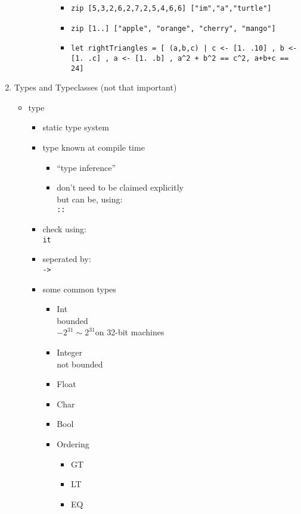 \documentclass[a4paper,10pt]{article}
\begin{document}
\begin{enumerate}
\begin{enumerate}
\begin{itemize}
\begin{itemize}
\begin{itemize}
    \item \texttt{zip [5,3,2,6,2,7,2,5,4,6,6] ["im","a","turtle"]}
    \item \texttt{zip [1..] ["apple", "orange", "cherry", "mango"]}
    \item \texttt{let rightTriangles\textquotesingle \  = [ (a,b,c) | c <- [1. .10] , b <- [1. .c] , a <- [1. .b] , a\^{}2 + b\^{}2 == c\^{}2, a+b+c == 24]}
   \end{itemize}
  \end{itemize}
  \end{itemize}
  \end{enumerate}
  \item Types and Typeclasses (not that important)
  \begin{itemize}
   \item type
   \begin{itemize}
    \item static type system
    \item type known at compile time
    \begin{itemize}
     \item ``type inference''
     \item don't need to be claimed explicitly
     \\but can be, using:
     \\\texttt{::}
    \end{itemize}
    \item check using: 
    \\\texttt{it}
    \item seperated by:
    \\\texttt{->}
    \item some common types
    \begin{itemize}
     \item Int
     \\bounded
     \\$-2^{31} \sim 2^{31}$on 32-bit machines
     \item Integer
     \\not bounded
     \item Float
     \item Char
     \item Bool
     \item Ordering
     \begin{itemize}
      \item GT
      \item LT
      \item EQ
     \end{itemize}

\end{itemize}
\end{itemize}
\end{itemize}
\end{enumerate}
\end{document}

